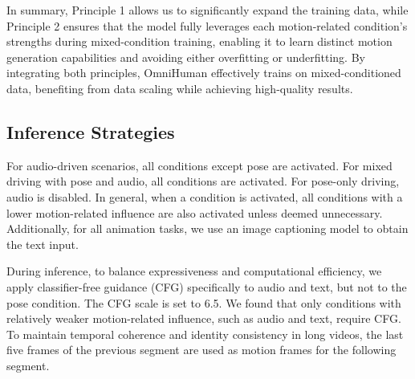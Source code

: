 In summary, Principle 1 allows us to significantly expand the training data, while Principle 2 ensures that the model fully leverages each motion-related condition’s strengths during mixed-condition training, enabling it to learn distinct motion generation capabilities and avoiding either overfitting or underfitting. By integrating both principles, OmniHuman effectively trains on mixed-conditioned data, benefiting from data scaling while achieving high-quality results.


\subsection{Inference Strategies}
For audio-driven scenarios, all conditions except pose are activated. For mixed driving with pose and audio, all conditions are activated. For pose-only driving, audio is disabled. In general, when a condition is activated, all conditions with a lower motion-related influence are also activated unless deemed unnecessary. Additionally, for all animation tasks, we use an image captioning model to obtain the text input.

During inference, to balance expressiveness and computational efficiency, we apply classifier-free guidance (CFG) specifically to audio and text, but not to the pose condition. The CFG scale is set to 6.5. We found that only conditions with relatively weaker motion-related influence, such as audio and text, require CFG. To maintain temporal coherence and identity consistency in long videos, the last five frames of the previous segment are used as motion frames for the following segment. 


